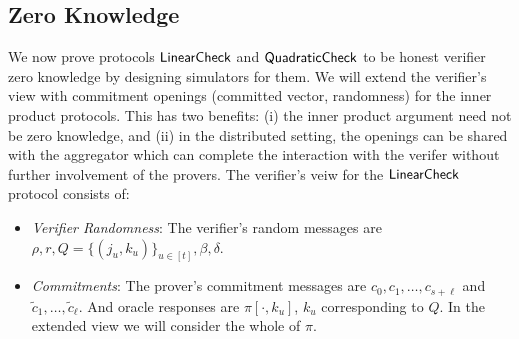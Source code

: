 \subsection{Zero Knowledge}
We now prove protocols $\mathsf{LinearCheck}$ and $\mathsf{QuadraticCheck}$ to be honest verifier
zero knowledge by designing simulators for them. We will extend the verifier's
view with commitment openings (committed vector, randomness) for the inner
product protocols. This has two benefits: (i) the inner product argument need
not be zero knowledge, and (ii) in the distributed setting, the openings can be
shared with the aggregator which can complete the interaction with the verifer
without further involvement of the provers. The verifier's veiw for
the $\mathsf{LinearCheck}$ protocol consists of:
\begin{itemize}[\leftmargin=0pt]
\item {\em Verifier Randomness}: The verifier's random messages are $\rho, r, Q = \{(j_u,k_u)\}_{u\in [t]}, \beta, \delta$.

\item {\em Commitments}: The prover's commitment messages are $c_0, c_1, \ldots, c_{s+\ell}$ and $\tilde{c}_1, \ldots, \tilde{c}_{\ell}$. And oracle responses are $\pi[\cdot,k_u]$, $k_u$ corresponding to $Q$. In the extended view we will consider the whole of $\pi$.


\end{itemize}
